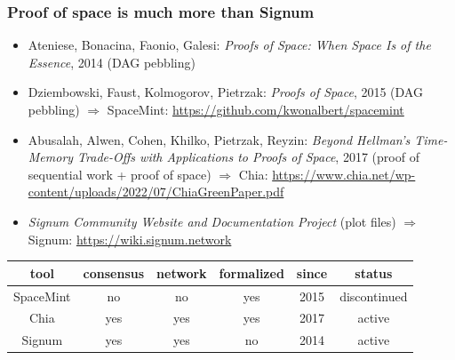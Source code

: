 \documentclass[11pt]{beamer}  %
\begin{document}
\begin{frame}\frametitle{Proof of space is much more than Signum}

  \begin{greenbox}{}
    \begin{itemize}
    \item Ateniese, Bonacina, Faonio, Galesi: \emph{Proofs of Space: When Space Is of the Essence}, 2014 (DAG pebbling)
    \item Dziembowski, Faust, Kolmogorov, Pietrzak: \emph{Proofs of Space}, 2015 (DAG pebbling) $\Rightarrow$
      {\color{red}SpaceMint}: \url{https://github.com/kwonalbert/spacemint}
    \item Abusalah, Alwen, Cohen, Khilko, Pietrzak, Reyzin: \emph{Beyond Hellman's Time-Memory Trade-Offs with Applications to Proofs of Space}, 2017 (proof of sequential work + proof of space) $\Rightarrow$ {\color{red}Chia}: \url{https://www.chia.net/wp-content/uploads/2022/07/ChiaGreenPaper.pdf}
    \item \emph{Signum Community Website and Documentation Project} (plot files) $\Rightarrow$ {\color{red}Signum}: \url{https://wiki.signum.network}
    \end{itemize}

  \begin{center}
    {\small\begin{tabular}{c|c|c|c|c|c}
      tool & consensus & network & formalized & since & status \\\hline\hline
      SpaceMint & no & no & yes & 2015 & discontinued\\\hline
      Chia & yes & yes & yes & 2017 & active\\\hline
      Signum & yes & yes & no & 2014 & active\\\hline
    \end{tabular}}
  \end{center}
  \end{greenbox}
  
\end{frame}
\end{document}
